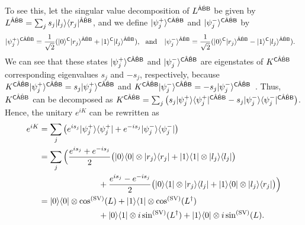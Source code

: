 To see this, let the singular value decomposition of $L^{\hat{{\mathsf{A}}}\hat{{\mathsf{B}}}{\mathsf{B}}}$ be given by $L^{\hat{{\mathsf{A}}}\hat{{\mathsf{B}}}{\mathsf{B}}} = \sum_j s_j |l_j\rangle\langle r_j|^{\hat{{\mathsf{A}}}\hat{{\mathsf{B}}}{\mathsf{B}}}$, and we define $|\psi_j^+\rangle^{{\mathsf{C}}\hat{{\mathsf{A}}}\hat{{\mathsf{B}}}{\mathsf{B}}}$ and $|\psi_j^-\rangle^{{\mathsf{C}}\hat{{\mathsf{A}}}\hat{{\mathsf{B}}}{\mathsf{B}}}$ by
\begin{align}
    &\ket{\psi_j^+}^{\sC\hat{\sA}\hat{\sB}\sB} = \f{1}{\sqrt{2}}(\ket{0}^\sC \ket{r_j}^{\hat{\sA}\hat{\sB}\sB} + \ket{1}^\sC \ket{l_j}^{\hat{\sA}\hat{\sB}\sB}), \ \ \text{and} \ \ \ \ket{\psi_j^-}^{\hat{\sA}\hat{\sB}\sB} = \f{1}{\sqrt{2}}(\ket{0}^\sC \ket{r_j}^{\hat{\sA}\hat{\sB}\sB} - \ket{1}^\sC \ket{l_j}^{\hat{\sA}\hat{\sB}\sB}).
\end{align}
We can see that these states $|\psi_j^+\rangle^{{\mathsf{C}}\hat{{\mathsf{A}}}\hat{{\mathsf{B}}}{\mathsf{B}}}$ and $|\psi_j^-\rangle^{{\mathsf{C}}\hat{{\mathsf{A}}}\hat{{\mathsf{B}}}{\mathsf{B}}}$ are eigenstates of $K^{{\mathsf{C}}\hat{{\mathsf{A}}}\hat{{\mathsf{B}}}{\mathsf{B}}}$ corresponding eigenvalues $s_j$ and $-s_j$, respectively, because $K^{{\mathsf{C}}\hat{{\mathsf{A}}}\hat{{\mathsf{B}}}{\mathsf{B}}}|\psi_j^+\rangle^{{\mathsf{C}}\hat{{\mathsf{A}}}\hat{{\mathsf{B}}}{\mathsf{B}}} = s_j |\psi_j^+\rangle^{{\mathsf{C}}\hat{{\mathsf{A}}}\hat{{\mathsf{B}}}{\mathsf{B}}}$ and $K^{{\mathsf{C}}\hat{{\mathsf{A}}}\hat{{\mathsf{B}}}{\mathsf{B}}}|\psi_j^-\rangle^{{\mathsf{C}}\hat{{\mathsf{A}}}\hat{{\mathsf{B}}}{\mathsf{B}}} = -s_j |\psi_j^-\rangle^{{\mathsf{C}}\hat{{\mathsf{A}}}\hat{{\mathsf{B}}}{\mathsf{B}}}$~\cite{lloyd2020polardecomposition, lloyd2021hamiltonianQSVT, Lin2022LectureNotes, Odake2024Highoder}.
Thus, $K^{{\mathsf{C}}\hat{{\mathsf{A}}}\hat{{\mathsf{B}}}{\mathsf{B}}}$ can be decomposed as $K^{{\mathsf{C}}\hat{{\mathsf{A}}}\hat{{\mathsf{B}}}{\mathsf{B}}} = \sum_j \big(s_j|\psi_j^+\rangle\langle\psi_j^+|^{{\mathsf{C}}\hat{{\mathsf{A}}}\hat{{\mathsf{B}}}{\mathsf{B}}} - s_j |\psi_j^-\rangle\langle\psi_j^-|^{{\mathsf{C}}\hat{{\mathsf{A}}}\hat{{\mathsf{B}}}{\mathsf{B}}} \big)$.
Hence, the unitary $e^{iK}$ can be rewritten as
\begin{align}
    e^{iK}
    &= \sum_j \big(e^{i s_j}\ketbra{\psi_j^+}{\psi_j^+} + e^{-i s_j} \ketbra{\psi_j^-}{\psi_j^-}\big) \\
    &= \sum_j \Big(\f{e^{i s_j}+e^{-i s_j}}{2}\big(\ketbra{0}{0} \otimes \ketbra{r_j}{r_j} 
    + \ketbra{1}{1} \otimes \ketbra{l_j}{l_j}\big) \notag\\
    &\hspace{6pc}+ \f{e^{i s_j}-e^{-i s_j}}{2}\big(\ketbra{0}{1} \otimes \ketbra{r_j}{l_j}
    + \ketbra{1}{0} \otimes \ketbra{l_j}{r_j}\big)\Big) \\
    &= \ketbra{0}{0} \otimes \cos^{(\rm SV)}(L) + \ketbra{1}{1} \otimes \cos^{(\rm SV)}(L^\dag) \notag\\
    &\hspace{6pc}+ \ketbra{0}{1} \otimes i\sin^{(\rm SV)}(L^\dag) + \ketbra{1}{0} \otimes i\sin^{(\rm SV)}(L).
\end{align}





